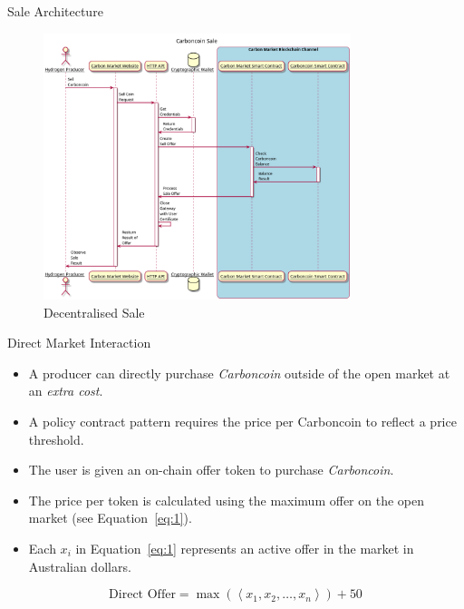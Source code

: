\begin{frame}{Sale Architecture}
    \begin{figure}
        \caption{Decentralised Sale}
        \centering
        \includegraphics[height=0.7\textheight, width=0.8\textwidth]
        {figures/CreateSale.png}
    \end{figure}
\end{frame}
\begin{frame}{Direct Market Interaction}
    \begin{itemize}
        \item A producer can directly purchase
              \textit{Carboncoin} outside of the open market
              at an \textit{extra cost}.
        \item A policy contract pattern requires the price per
              Carboncoin to reflect a price threshold.
        \item The user is given an on-chain offer token to purchase
              \textit{Carboncoin}.
        \item The price per token is calculated using the maximum offer on the
              open market (see Equation~\ref{eq:1}).
        \item Each $x_i$ in Equation~\ref{eq:1} represents an active offer
              in the market in Australian dollars.
    \end{itemize}
    \begin{equation}
        \text{Direct Offer} =
        \max \left(\left\langle x_1, x_2, \dots, x_n \right\rangle\right) + 50
        \label{eq:1}
    \end{equation}
\end{frame}
